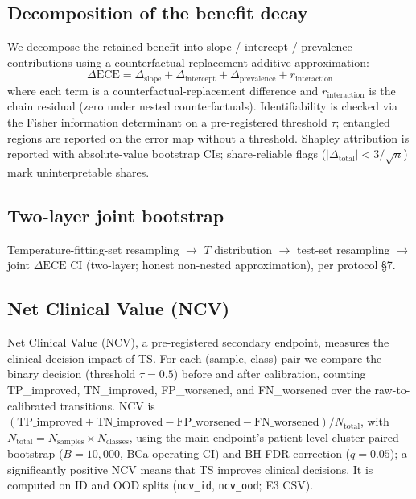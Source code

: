 \documentclass[review,12pt,nonatbib]{elsarticle}
\begin{document}
\subsection{Decomposition of the benefit decay}
\label{sec:decomp}
We decompose the retained benefit into slope / intercept / prevalence
contributions using a counterfactual-replacement additive approximation:
\begin{equation}
    \Delta\text{ECE} = \Delta_{\text{slope}}
    + \Delta_{\text{intercept}}
    + \Delta_{\text{prevalence}}
    + r_{\text{interaction}}
\end{equation}
where each term is a counterfactual-replacement difference and
$r_{\text{interaction}}$ is the chain residual (zero under nested
counterfactuals). Identifiability is checked via the Fisher information
determinant on a pre-registered threshold $\tau$; entangled regions are
reported on the error map without a threshold. Shapley attribution is
reported with absolute-value bootstrap CIs; share-reliable flags
($|\Delta_{\text{total}}|<3/\sqrt{n}$) mark uninterpretable shares.

\subsection{Two-layer joint bootstrap}
Temperature-fitting-set resampling $\rightarrow$ $T$ distribution
$\rightarrow$ test-set resampling $\rightarrow$ joint $\Delta\text{ECE}$ CI
(two-layer; honest non-nested approximation), per protocol \S7.

\subsection{Net Clinical Value (NCV)}
\label{sec:ncv_methods}
Net Clinical Value (NCV), a pre-registered secondary endpoint, measures
the clinical decision impact of TS. For each (sample, class)
pair we compare the binary decision (threshold $\tau=0.5$) before and
after calibration, counting TP\_improved, TN\_improved, FP\_worsened, and
FN\_worsened over the raw-to-calibrated transitions. NCV is
$(\text{TP\_improved} + \text{TN\_improved} - \text{FP\_worsened}
- \text{FN\_worsened}) / N_{\text{total}}$, with
$N_{\text{total}} = N_{\text{samples}} \times N_{\text{classes}}$, using
the main endpoint's patient-level cluster paired bootstrap ($B=10{,}000$,
BCa operating CI) and BH-FDR correction ($q=0.05$); a significantly
positive NCV means that TS improves clinical decisions. It is computed on
ID and OOD splits (\texttt{ncv\_id}, \texttt{ncv\_ood}; E3 CSV).
\end{document}
